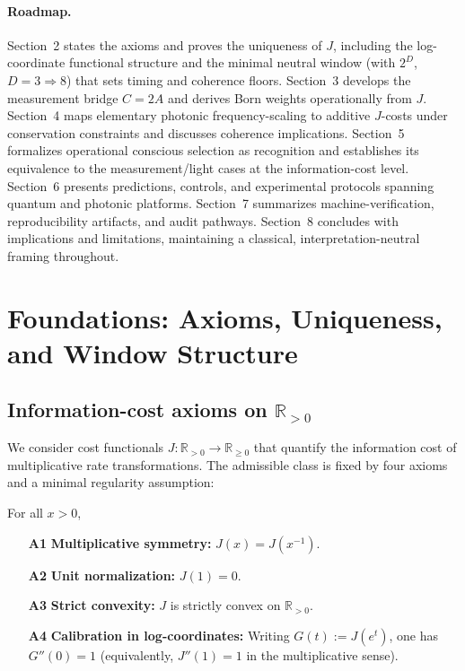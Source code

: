 \documentclass[12pt,a4paper]{article}
\begin{document}
\paragraph{Roadmap.}
Section~2 states the axioms and proves the uniqueness of $J$, including the log-coordinate functional structure and the minimal neutral window (with $2^{D}$, $D=3\Rightarrow 8$) that sets timing and coherence floors. Section~3 develops the measurement bridge $C=2A$ and derives Born weights operationally from $J$. Section~4 maps elementary photonic frequency-scaling to additive $J$-costs under conservation constraints and discusses coherence implications. Section~5 formalizes operational conscious selection as recognition and establishes its equivalence to the measurement/light cases at the information-cost level. Section~6 presents predictions, controls, and experimental protocols spanning quantum and photonic platforms. Section~7 summarizes machine-verification, reproducibility artifacts, and audit pathways. Section~8 concludes with implications and limitations, maintaining a classical, interpretation-neutral framing throughout.

\section{Foundations: Axioms, Uniqueness, and Window Structure}

\subsection{Information-cost axioms on $\mathbb{R}_{>0}$}
We consider cost functionals $J:\mathbb{R}_{>0}\to\mathbb{R}_{\ge 0}$ that quantify the information cost of multiplicative rate transformations. The admissible class is fixed by four axioms and a minimal regularity assumption:

\begin{axiom}\label{ax:cost}
For all $x>0$,
\begin{enumerate}
  \item[\textbf{A1}] \textbf{Multiplicative symmetry:} $J(x)=J(x^{-1})$.
  \item[\textbf{A2}] \textbf{Unit normalization:} $J(1)=0$.
  \item[\textbf{A3}] \textbf{Strict convexity:} $J$ is strictly convex on $\mathbb{R}_{>0}$.
  \item[\textbf{A4}] \textbf{Calibration in log-coordinates:} Writing $G(t):=J(e^{t})$, one has $G''(0)=1$ (equivalently, $J''(1)=1$ in the multiplicative sense).
\end{enumerate}
\end{axiom}
\end{document}

